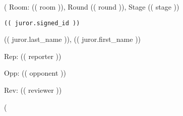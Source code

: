 \documentclass{minimal}
\begin{document}
%
\begin{center}%
(%
Room: (( room )), Round (( round )), Stage (( stage ))

\begin{verbatim}
(( juror.signed_id ))
\end{verbatim}


	(( juror.last_name )), (( juror.first_name ))

    Rep: (( reporter ))

    Opp: (( opponent ))

    Rev: (( reviewer ))


    \newpage
(%
\end{center}%
\end{document}
